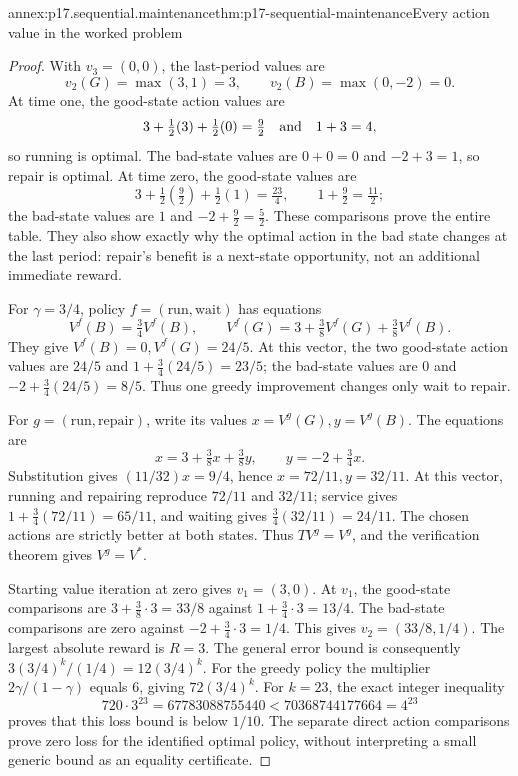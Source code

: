 \begin{annexitem}{annex:p17.sequential.maintenance}{thm:p17-sequential-maintenance}{Every action value in the worked problem}
\begin{proof}
With \(v_3=(0,0)\), the last-period values are
\[
 v_2(G)=\max(3,1)=3,\qquad
 v_2(B)=\max(0,-2)=0.
\]
At time one, the good-state action values
are
\[
        3+\tfrac12(3)+\tfrac12(0)=\tfrac92
                  \quad\hbox{and}\quad 1+3=4,
\]
so running is optimal. The bad-state values
are \(0+0=0\) and \(-2+3=1\), so repair is
optimal. At time zero, the good-state values
are
\[
          3+\tfrac12(\tfrac92)+\tfrac12(1)=\tfrac{23}4,
                    \qquad 1+\tfrac92=\tfrac{11}2;
\]
the bad-state values are \(1\) and
\(-2+\tfrac92=\tfrac52\).
These comparisons prove the entire table.
They also show exactly why the optimal action
in the bad state changes at the last period:
repair's benefit is a next-state opportunity,
not an additional immediate reward.

For \(\gamma=3/4\), policy
\(f=(\text{run},\text{wait})\) has equations
\[
 V^f(B)=\tfrac34V^f(B),\qquad
 V^f(G)=3+\tfrac38V^f(G)+\tfrac38V^f(B).
\]
They give \(V^f(B)=0,V^f(G)=24/5\).
At this vector, the two good-state action
values are \(24/5\) and
\(1+\tfrac34(24/5)=23/5\);
the bad-state values are \(0\) and
\(-2+\tfrac34(24/5)=8/5\).
Thus one greedy improvement changes only
wait to repair.

For \(g=(\text{run},\text{repair})\), write
its values \(x=V^g(G),y=V^g(B)\). The equations
are
\[
            x=3+\tfrac38x+\tfrac38y,\qquad
            y=-2+\tfrac34x.
\]
Substitution gives \((11/32)x=9/4\), hence
\(x=72/11,y=32/11\).
At this vector, running and repairing
reproduce \(72/11\) and \(32/11\);
service gives \(1+\tfrac34(72/11)=65/11\),
and waiting gives \(\tfrac34(32/11)=24/11\).
The chosen actions are strictly better at
both states. Thus \(TV^g=V^g\), and the
verification theorem gives \(V^g=V^*\).

Starting value iteration at zero gives
\(v_1=(3,0)\).
At \(v_1\), the good-state comparisons are
\(3+\tfrac38\cdot3=33/8\) against
\(1+\tfrac34\cdot3=13/4\).
The bad-state comparisons are zero against
\(-2+\tfrac34\cdot3=1/4\).
This gives \(v_2=(33/8,1/4)\).
The largest absolute reward is \(R=3\).
The general error bound is consequently
\(3(3/4)^k/(1/4)=12(3/4)^k\).
For the greedy policy the multiplier
\(2\gamma/(1-\gamma)\) equals \(6\),
giving \(72(3/4)^k\).
For \(k=23\), the exact integer inequality
\[
          720\cdot3^{23}
              =67783088755440
                <70368744177664=4^{23}
\]
proves that this loss bound is below \(1/10\).
The separate direct action comparisons prove
zero loss for the identified optimal policy,
without interpreting a small generic bound
as an equality certificate.
\end{proof}
\end{annexitem}


